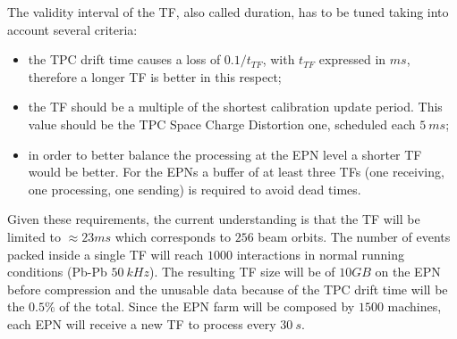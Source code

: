 The validity interval of the TF, also called duration, has to be tuned taking into account several criteria:
\begin{itemize}
    \item the TPC drift time causes a loss of $0.1/t_{TF}$, with $t_{TF}$ expressed in $ms$, therefore a longer TF is better in this respect;
    \item the TF should be a multiple of the shortest calibration update period. This value should be the TPC Space Charge Distortion one, scheduled each $5\ ms$;
    \item in order to better balance the processing at the EPN level a shorter TF would be better. For the EPNs a buffer of at least three TFs (one receiving, one processing, one sending) is required to avoid dead times.
\end{itemize}
Given these requirements, the current understanding is that the TF will be limited to $\approx23 ms$ which corresponds to $256$ beam orbits.
The number of events packed inside a single TF will reach $1000$ interactions in normal running conditions (Pb-Pb $50\ kHz$).
The resulting TF size will be of $10GB$ on the EPN before compression and the unusable data because of the TPC drift time will be the $0.5\%$ of the total.
Since the EPN farm will be composed by $1500$ machines, each EPN will receive a new TF to process every $30\ s$.

